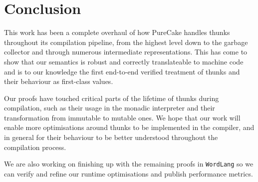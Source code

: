 \documentclass[sigconf]{acmart}
\newcommand{\code}[1]{\texttt{#1}}
\newcommand{\WordLang}{\code{WordLang}}
\begin{document}
\section{Conclusion}
\label{sec:conclusion}

This work has been a complete overhaul of how PureCake handles thunks throughout
its compilation pipeline, from the highest level down to the garbage collector
and through numerous intermediate representations. This has come to show that
our semantics is robust and correctly translateable to machine code and is to
our knowledge the first end-to-end verified treatment of thunks and their
behaviour as first-class values.

Our proofs have touched critical parts of the lifetime of thunks during
compilation, such as their usage in the monadic interpreter and their
transformation from immutable to mutable ones. We hope that our work will enable
more optimisations around thunks to be implemented in the compiler, and in
general for their behaviour to be better understood throughout the compilation
process.

We are also working on finishing up with the remaining proofs in \WordLang{} so
we can verify and refine our runtime optimisations and publish performance
metrics.



\end{document}
